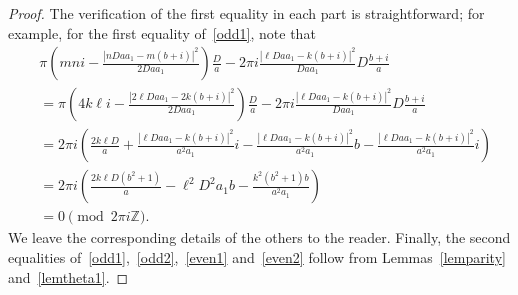 \documentclass[11pt, reqno]{amsart}
\theoremstyle{plain}
\theoremstyle{definition}
\numberwithin{equation}{section}
\begin{document}
\begin{proof}
The verification of the first equality in each part is straightforward; for example, for the first equality of~\eqref{odd1}, note that
 \begin{align*}
        &\pi(mni-\frac{|nDaa_{1}-m(b+i)|^{2}}{2Daa_{1}})\frac{D}{a}-2\pi i\frac{|\ell Daa_{1}-k(b+i)|^{2}}{Daa_{1}}D\frac{b+i}{a}\\
        &=\pi(4k\ell i-\frac{|2\ell Daa_{1}-2k(b+i)|^{2}}{2Daa_{1}})\frac{D}{a}-2\pi i\frac{|\ell Daa_{1}-k(b+i)|^{2}}{Daa_{1}}D\frac{b+i}{a}\\
        &=2\pi i\left(\frac{2k\ell D}{a} +\frac{|\ell Daa_{1}-k(b+i)|^{2}}{a^{2}a_{1}}i-\frac{|\ell Daa_{1}-k(b+i)|^{2}}{a^{2}a_{1}}b-\frac{|\ell Daa_{1}-k(b+i)|^{2}}{a^{2}a_{1}}i\right)\\
        &=2\pi i\left(\frac{2k\ell D(b^{2}+1)}{a}-\ell^{2}D^{2}a_{1}b-\frac{k^{2}(b^{2}+1)b}{a^{2}a_{1}}\right)\\
        &=0\pmod{2\pi i\mathbb{Z}}.
    \end{align*}
We leave the corresponding details of the others to the reader. Finally, the second equalities of~\eqref{odd1},~\eqref{odd2},~\eqref{even1} and~\eqref{even2} follow from Lemmas~\ref{lemparity} and~\ref{lemtheta1}.


    

\end{proof}
\end{document}
